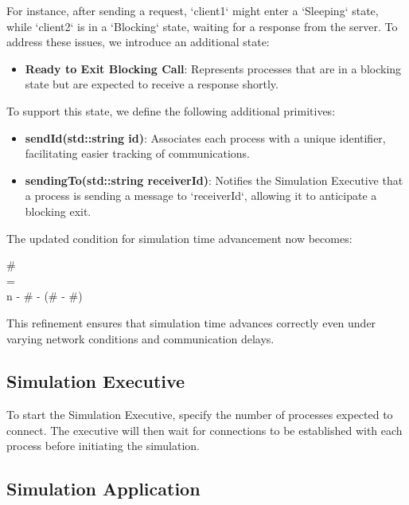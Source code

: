 For instance, after sending a request, `client1` might enter a `Sleeping` state, while `client2` is in a `Blocking` state, waiting for a response from the server. To address these issues, we introduce an additional state:

\begin{itemize}
    \item \textbf{Ready to Exit Blocking Call}: Represents processes that are in a blocking state but are expected to receive a response shortly.
\end{itemize}

To support this state, we define the following additional primitives:

\begin{itemize}
    \item \textbf{sendId(std::string id)}: Associates each process with a unique identifier, facilitating easier tracking of communications.
    \item \textbf{sendingTo(std::string receiverId)}: Notifies the Simulation Executive that a process is sending a message to `receiverId`, allowing it to anticipate a blocking exit.
\end{itemize}

The updated condition for simulation time advancement now becomes:

\begin{center}
    \# \\ = \\  n - \# - (\# - \#)
\end{center}

This refinement ensures that simulation time advances correctly even under varying network conditions and communication delays.

\subsection*{Simulation Executive}

To start the Simulation Executive, specify the number of processes expected to connect. The executive will then wait for connections to be established with each process before initiating the simulation.

\subsection*{Simulation Application}

